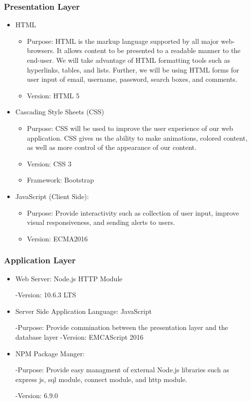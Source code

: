 \documentclass[letter, 12pt, titlepage]{article}
\begin{document}
			\subsubsection{Presentation Layer}
			\begin{itemize}
			 \item HTML
				\begin{itemize}
					\item Purpose: HTML is the markup language supported by all major web-browsers. It allows content to be presented to a readable manner to the end-user. We will take advantage of HTML formatting tools such as hyperlinks, tables, and lists. Further, we will be using HTML forms for user input of email, username, password, search boxes, and comments.
					\item Version: HTML 5
				\end{itemize}
			\item Cascading Style Sheets (CSS)
			\begin{itemize}	
				\item Purpose: CSS will be used to improve the user experience of our web application. CSS gives us the ability to make animations, colored content, as well as more control of the appearance of our content.
				\item Version: CSS 3
				\item Framework: Bootstrap
			\end{itemize}
			\item	JavaScript (Client Side):
				\begin{itemize}
					\item	Purpose: Provide interactivity such as collection of user input, improve visual responsiveness, and sending alerts to users.
					\item Version: ECMA2016
				\end{itemize}
			\end{itemize}

		\subsubsection{Application Layer}
		\begin{itemize}
			\item Web Server: Node.js HTTP Module
			
				-Version: 10.6.3 LTS
			
			\item Server Side Application Language: JavaScript
				
				-Purpose: Provide commination between the presentation layer and the database layer
				-Version: EMCAScript 2016

			\item	NPM Package Manger:

				-Purpose: Provide easy managment of external Node.js libraries such as express js, sql module, connect module, and http module.

				-Version: 6.9.0 
		\end{itemize}	
\end{document}
